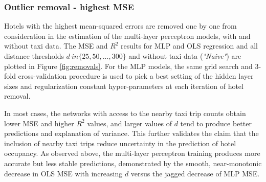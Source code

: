 \documentclass[useAMS, usenatbib]{biom}
\begin{document}
%

\subsubsection{Outlier removal - highest MSE}

Hotels with the highest mean-squared errors are removed one by one from consideration in the estimation of the multi-layer perceptron models, with and without taxi data. The MSE and $R^2$ results for MLP and OLS regression and all distance thresholds $d \ in \{25, 50, ..., 300 \}$ and without taxi data (\textit{"Naive"}) are plotted in Figure \ref{fig:removals}. For the MLP models, the same grid search and 3-fold cross-validation procedure is used to pick a best setting of the hidden layer sizes and regularization constant hyper-parameters at each iteration of hotel removal.

In most cases, the networks with access to the nearby taxi trip counts obtain lower MSE and higher $R^2$ values, and larger values of $d$ tend to produce better predictions and explanation of variance. This further validates the claim that the inclusion of nearby taxi trips reduce uncertainty in the prediction of hotel occupancy. As observed above, the multi-layer perceptron training produces more accurate but less stable predictions, demonstrated by the smooth, near-monotonic decrease in OLS MSE with increasing $d$ versus the jagged decrease of MLP MSE. 
\end{document}
